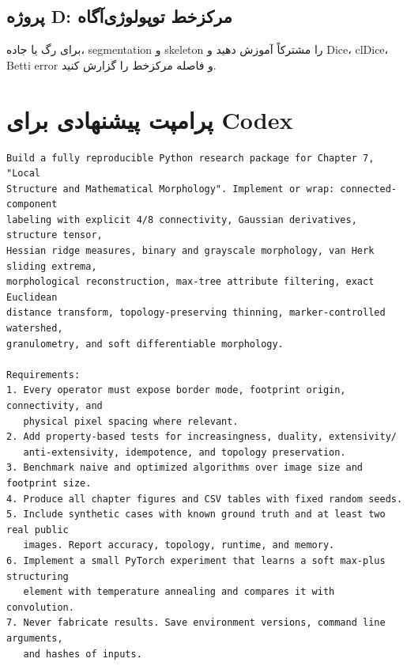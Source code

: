 \documentclass[12pt,openany,oneside]{book}
\begin{document}
\subsection{پروژه D: مرکزخط توپولوژی‌آگاه}
برای رگ یا جاده، segmentation و skeleton را مشترکاً آموزش دهید و Dice، clDice، Betti error و فاصله مرکزخط را گزارش کنید.

\section{پرامپت پیشنهادی برای Codex}
\begin{latin}
\begin{lstlisting}[language={}]
Build a fully reproducible Python research package for Chapter 7, "Local
Structure and Mathematical Morphology". Implement or wrap: connected-component
labeling with explicit 4/8 connectivity, Gaussian derivatives, structure tensor,
Hessian ridge measures, binary and grayscale morphology, van Herk sliding extrema,
morphological reconstruction, max-tree attribute filtering, exact Euclidean
distance transform, topology-preserving thinning, marker-controlled watershed,
granulometry, and soft differentiable morphology.

Requirements:
1. Every operator must expose border mode, footprint origin, connectivity, and
   physical pixel spacing where relevant.
2. Add property-based tests for increasingness, duality, extensivity/
   anti-extensivity, idempotence, and topology preservation.
3. Benchmark naive and optimized algorithms over image size and footprint size.
4. Produce all chapter figures and CSV tables with fixed random seeds.
5. Include synthetic cases with known ground truth and at least two real public
   images. Report accuracy, topology, runtime, and memory.
6. Implement a small PyTorch experiment that learns a soft max-plus structuring
   element with temperature annealing and compares it with convolution.
7. Never fabricate results. Save environment versions, command line arguments,
   and hashes of inputs.
\end{lstlisting}
\end{latin}
\end{document}
